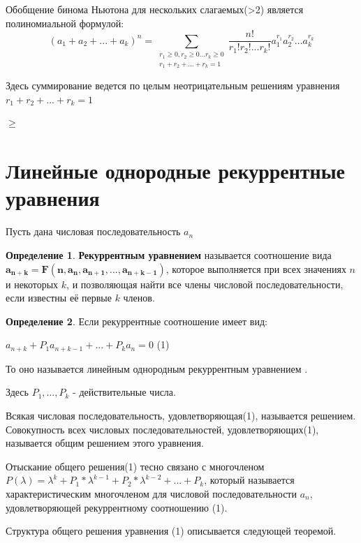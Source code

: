 \documentclass[12pt, a4paper, oneside]{article}
\theoremstyle{plain} %
\theoremstyle{definition}
\newtheorem*{definition}{Определение}  %
\newcommand{\indef}[1]{\textbf{ \color{dark_red} #1}}
\begin{document}
Обобщение бинома Ньютона для нескольких слагаемых(>2) является полиномиальной формулой:
\[
(a_1 + a_2 + ... + a_k)^n = \sum\limits_{\substack{r_1\geq 0,r_2\geq 0...r_k\geq 0 \\ r_1+r_2+...+r_k=1 }} \frac{n!}{r_1!r_2!...r_k!} a_1^{r_1} a_2^{r_2} \dotsc a_k^{r_k}
\]



Здесь суммирование ведется по целым неотрицательным решениям уравнения $r_1+r_2+...+r_k=1$ 

$\geq$

\section{Линейные однородные рекуррентные уравнения}

Пусть дана числовая последовательность $a_n$

\begin{definition}
\indef{Рекуррентным уравнением} называется соотношение вида $\mathbf{a_{n+k} = F(n,a_n,a_{n+1}, ..., a_{n+k-1})}$, которое выполняется при всех значениях $n$ и некоторых $k$, 
и позволяющая найти все члены числовой последовательности, если известны её первые $k$ членов.
\end{definition}
\begin{definition}
Если рекуррентные соотношение имеет вид:

$ a_{n+k} + P_1a_{n+k-1} + ... +P_ka_n = 0$ (1)%

То оно называется линейным однородным рекуррентным уравнением .

Здесь  $P_1,...,P_k$ - действительные числа.
\end{definition}

Всякая числовая последовательность, удовлетворяющая(1), называется решением. Совокупность всех числовых последовательностей, удовлетворяющих(1), называется общим решением этого уравнения.

Отыскание общего решения(1) тесно связано с многочленом $P(\lambda)= \lambda^k + P_1*\lambda^{k-1} + P_2*\lambda^{k-2} + ... + P_k$, который называется характеристическим многочленом для числовой последовательности $a_n$, удовлетворяющей рекуррентному соотношению (1). 

Структура общего решения уравнения (1) описывается следующей теоремой.
\end{document}
